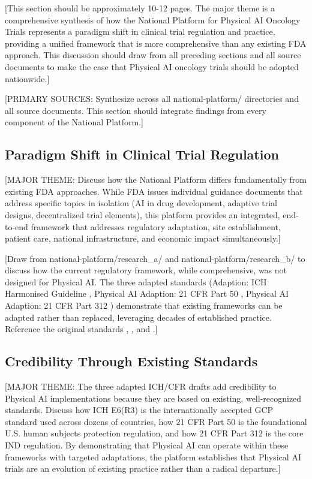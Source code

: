 
[This section should be approximately 10-12 pages. The major theme is a
comprehensive synthesis of how the National Platform for Physical AI Oncology
Trials represents a paradigm shift in clinical trial regulation and practice,
providing a unified framework that is more comprehensive than any existing FDA
approach. This discussion should draw from all preceding sections and all
source documents to make the case that Physical AI oncology trials should be
adopted nationwide.]

[PRIMARY SOURCES: Synthesize across all national-platform/ directories
and all source documents. This section should integrate findings from every
component of the National Platform.]

\subsection{Paradigm Shift in Clinical Trial Regulation}
\label{subsec:discuss-paradigm}

[MAJOR THEME: Discuss how the National Platform differs fundamentally from
existing FDA approaches. While FDA issues individual guidance documents that
address specific topics in isolation (AI in drug development, adaptive trial
designs, decentralized trial elements), this platform provides an integrated,
end-to-end framework that addresses regulatory adaptation, site establishment,
patient care, national infrastructure, and economic impact simultaneously.]

[Draw from national-platform/research\_a/ and national-platform/research\_b/
to discuss how the current regulatory framework, while comprehensive, was not
designed for Physical AI. The three adapted standards (Adaption: ICH Harmonised
Guideline \cite{ich-adapt}, Physical AI Adaption: 21 CFR Part 50
\cite{cfr50-adapt}, Physical AI Adaption: 21 CFR Part 312 \cite{cfr312-adapt})
demonstrate that existing frameworks can be adapted rather than replaced,
leveraging decades of established practice. Reference the original standards
\cite{ich-e6r3}, \cite{cfr-part-50}, and \cite{cfr-part-312}.]

\subsection{Credibility Through Existing Standards}
\label{subsec:discuss-credibility}

[MAJOR THEME: The three adapted ICH/CFR drafts add credibility to Physical AI
implementations because they are based on existing, well-recognized standards.
Discuss how ICH E6(R3) is the internationally accepted GCP standard used
across dozens of countries, how 21 CFR Part 50 is the foundational U.S.
human subjects protection regulation, and how 21 CFR Part 312 is the core
IND regulation. By demonstrating that Physical AI can operate within these
frameworks with targeted adaptations, the platform establishes that Physical
AI trials are an evolution of existing practice rather than a radical departure.]

